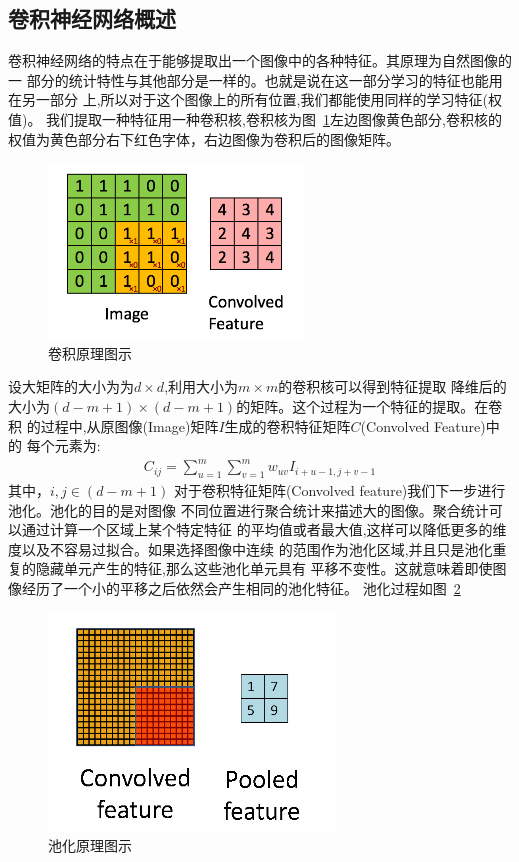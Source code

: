 \subsection{卷积神经网络概述}
卷积神经网络的特点在于能够提取出一个图像中的各种特征。其原理为自然图像的一
部分的统计特性与其他部分是一样的。也就是说在这一部分学习的特征也能用在另一部分
上,所以对于这个图像上的所有位置,我们都能使用同样的学习特征(权值)。
我们提取一种特征用一种卷积核,卷积核为图~\ref{fig:cnn1}左边图像黄色部分,卷积核的权值为黄色部分右下红色字体，右边图像为卷积后的图像矩阵。
\begin{figure}[htb]
\centering
\includegraphics[scale=0.7]{../figures/conv.png} 
\caption{卷积原理图示}
\label{fig:cnn1}
\end{figure}
设大矩阵的大小为为$d\times d$,利用大小为$m\times m$的卷积核可以得到特征提取
降维后的大小为$(d-m+1)\times(d-m+1)$的矩阵。这个过程为一个特征的提取。在卷积
的过程中,从原图像(Image)矩阵$I$生成的卷积特征矩阵$C$(Convolved Feature)中的
每个元素为:
\begin{eqnarray}
C_{ij}=\sum_{u=1}^m\sum_{v=1}^mw_{uv}I_{i+u-1,j+v-1}
\end{eqnarray}
其中，$i,j\in(d-m+1)$
对于卷积特征矩阵(Convolved feature)我们下一步进行池化。池化的目的是对图像
不同位置进行聚合统计来描述大的图像。聚合统计可以通过计算一个区域上某个特定特征
的平均值或者最大值,这样可以降低更多的维度以及不容易过拟合。如果选择图像中连续
的范围作为池化区域,并且只是池化重复的隐藏单元产生的特征,那么这些池化单元具有
平移不变性。这就意味着即使图像经历了一个小的平移之后依然会产生相同的池化特征。
池化过程如图~\ref{fig:cnn2}
\begin{figure}[htb]
\centering
\includegraphics[scale=0.7]{../figures/pool.png} 
\caption{池化原理图示}
\label{fig:cnn2}
\end{figure}
